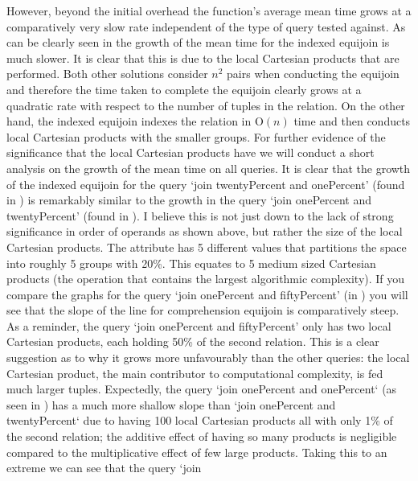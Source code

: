 However, beyond the initial overhead the
function's average mean time grows at a comparatively very slow rate independent
of the type of query tested against. As can be clearly seen in
 the growth of the mean time
for the indexed equijoin is much slower. It is clear that this is due to the
local Cartesian products that are performed. Both other solutions consider $n^2$
pairs when conducting the equijoin and therefore the time taken to complete the
equijoin clearly grows at a quadratic rate with respect to the number of tuples
in the relation. On the other hand, the indexed equijoin indexes the relation in
$\mathrm{O}(n)$ time and then conducts local Cartesian products with the smaller
groups. For further evidence of the significance that the local Cartesian
products have we will conduct a short analysis on the growth of the mean time on
all queries. It is clear that the growth of the indexed equijoin for the query
`join twentyPercent and onePercent' (found in
) is remarkably similar to the growth
in the query `join onePercent and twentyPercent' (found in
). I believe this is not
just down to the lack of strong significance in order of operands as shown
above, but rather the size of the local Cartesian products. The attribute
 has 5 different values that partitions the
space into roughly 5 groups with 20\%. This equates to 5 medium sized Cartesian
products (the operation that contains the largest algorithmic complexity). If
you compare the graphs for the query `join onePercent and fiftyPercent' (in
) you will see that the slope
of the line for comprehension equijoin is comparatively steep. As a reminder,
the query `join onePercent and fiftyPercent' only has two local Cartesian
products, each holding 50\% of the second relation. This is a clear suggestion
as to why it grows more unfavourably than the other queries: the local Cartesian
product, the main contributor to computational complexity, is fed much larger
tuples. Expectedly, the query `join onePercent and onePercent` (as seen in
) has a much more shallow slope
than `join onePercent and twentyPercent` due to having 100 local Cartesian
products all with only 1\% of the second relation; the additive effect of
having so many products is negligible compared to the multiplicative effect of
few large products. Taking this to an extreme we can see that the query `join
